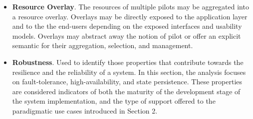 \documentclass{sig-alternate}
\begin{document}
\begin{itemize}

\item \textbf{Resource Overlay}. The resources of multiple pilots may be
  aggregated into a resource overlay. Overlays may be directly exposed to the
  application layer and to the the end-users depending on the exposed
  interfaces and usability models. Overlays may abstract away the notion of
  pilot or offer an explicit semantic for their aggregation, selection, and
  management.

\item \textbf{Robustness}. Used to identify those properties that contribute
  towards the resilience and the reliability of a \pilot system. In this
  section, the analysis focuses on fault-tolerance, high-availability, and
  state persistence. These properties are considered indicators of both the
  maturity of the development stage of the \pilot system implementation, and
  the type of support offered to the paradigmatic use cases introduced in
  Section 2.


\end{itemize}
\end{document}
